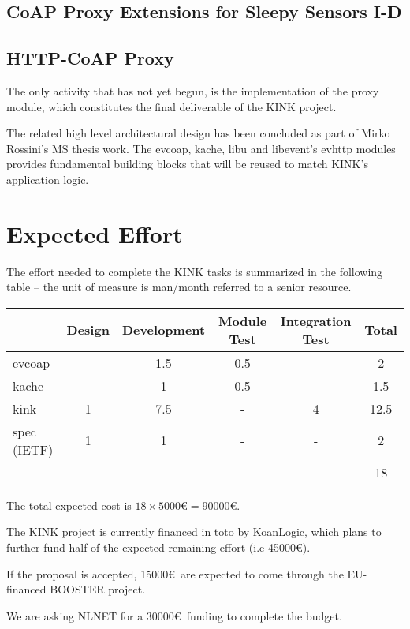 \documentclass[12pt]{article}
\begin{document}
\subsection{CoAP Proxy Extensions for Sleepy Sensors I-D}


\subsection{HTTP-CoAP Proxy}
The only activity that has not yet begun, is the implementation of the proxy module, which constitutes the final deliverable of the KINK project. 

The related high level architectural design has been concluded as part of Mirko Rossini's MS thesis work.  The evcoap, kache, libu and libevent's evhttp modules provides fundamental building blocks that will be reused to match KINK's application logic.

\section{Expected Effort}
The effort needed to complete the KINK tasks is summarized in the following table -- the unit of measure is man/month referred to a senior resource.

\begin{center}
\begin{tabular}{|l|c|c|c|c|c|}
	\hline 
	  & Design & Development & Module Test & Integration Test & Total \\
	\hline 
	evcoap & - & 1.5 & 0.5 & - & 2 \\
	\hline
	kache & - & 1 & 0.5 & - & 1.5 \\
	\hline
	kink & 1 & 7.5 & - & 4 & 12.5 \\
	\hline
	spec (IETF) & 1 & 1 & - & - & 2 \\
	\hline
	\multicolumn{5}{|c|}{} & 18 \\
	\hline
\end{tabular}
\end{center}

The total expected cost is $18 \times 5000$\euro $= 90000$\euro. 

The KINK project is currently financed in toto by KoanLogic, which plans to further fund half of the expected remaining effort (i.e 45000\euro).

If the proposal is accepted, 15000\euro~are expected to come through the EU-financed BOOSTER project.

We are asking NLNET for a 30000\euro~funding to complete the budget.
\end{document}
